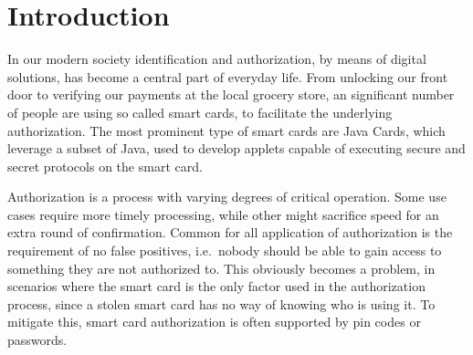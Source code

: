 \section{Introduction}

In our modern society identification and authorization, by means of digital solutions, has become a central part of everyday life.
From unlocking our front door to verifying our payments at the local grocery store, an significant number of people are using so called smart cards, to facilitate the underlying authorization.
The most prominent type of smart cards are Java Cards, which leverage a subset of Java, used to develop applets capable of executing secure and secret protocols on the smart card.

Authorization is a process with varying degrees of critical operation.
Some use cases require more timely processing, while other might sacrifice speed for an extra round of confirmation.
Common for all application of authorization is the requirement of no false positives, i.e.\ nobody should be able to gain access to something they are not authorized to.
This obviously becomes a problem, in scenarios where the smart card is the only factor used in the authorization process, since a stolen smart card has no way of knowing who is using it.
To mitigate this, smart card authorization is often supported by pin codes or passwords.




